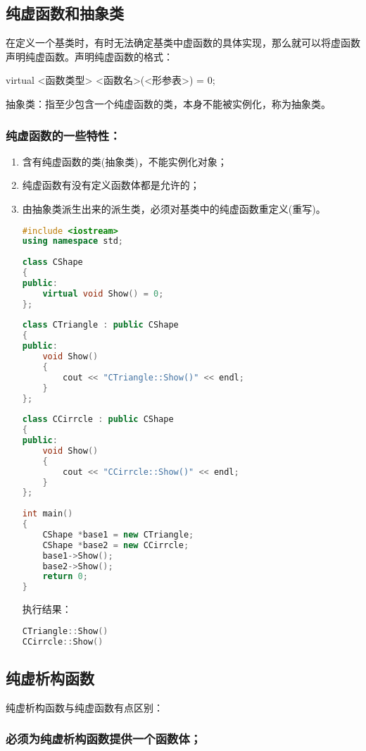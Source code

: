 \documentclass{article}
\begin{document}
\subsection{纯虚函数和抽象类}
\label{sec-8-7}

在定义一个基类时，有时无法确定基类中虚函数的具体实现，那么就可以将虚函数声明纯虚函数。声明纯虚函数的格式：

virtual <函数类型> <函数名>(<形参表>) = 0;

抽象类：指至少包含一个纯虚函数的类，本身不能被实例化，称为抽象类。

\subsubsection{纯虚函数的一些特性：}
\label{sec-8-7-1}
\begin{enumerate}
\item 含有纯虚函数的类(抽象类)，不能实例化对象；
\label{sec-8-7-1-1}
\item 纯虚函数有没有定义函数体都是允许的；
\label{sec-8-7-1-2}
\item 由抽象类派生出来的派生类，必须对基类中的纯虚函数重定义(重写)。
\label{sec-8-7-1-3}
\begin{lstlisting}[language=c++]
#include <iostream>  
using namespace std;  
  
class CShape  
{  
public:  
    virtual void Show() = 0;  
};  
  
class CTriangle : public CShape  
{  
public:  
    void Show()  
    {  
        cout << "CTriangle::Show()" << endl;  
    }  
};  
  
class CCirrcle : public CShape  
{  
public:  
    void Show()  
    {  
        cout << "CCirrcle::Show()" << endl;  
    }  
};  
  
int main()  
{  
    CShape *base1 = new CTriangle;  
    CShape *base2 = new CCirrcle;  
    base1->Show();  
    base2->Show();  
    return 0;  
}  
\end{lstlisting}
执行结果：
\begin{lstlisting}[language=c++]
CTriangle::Show()
CCirrcle::Show()
\end{lstlisting}
\end{enumerate}
\subsection{纯虚析构函数}
\label{sec-8-8}

纯虚析构函数与纯虚函数有点区别：

\subsubsection{必须为纯虚析构函数提供一个函数体；}
\label{sec-8-8-1}
\end{document}
